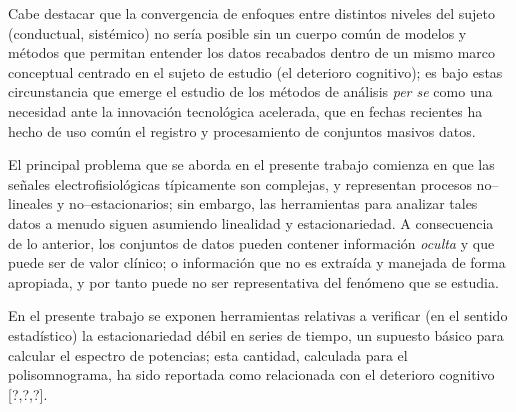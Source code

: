 Cabe destacar que 
la convergencia de enfoques entre distintos niveles del sujeto (conductual, sistémico) no sería
posible sin un cuerpo común de modelos y métodos que permitan entender los datos recabados dentro
de un mismo marco conceptual centrado en el sujeto de estudio (el deterioro cognitivo);
es bajo estas circunstancia que emerge el estudio de los métodos de análisis \textit{per se}
como una necesidad ante la innovación tecnológica acelerada, que en fechas recientes ha hecho
de uso común el registro y procesamiento de conjuntos masivos datos.

El principal problema que se aborda en el presente trabajo comienza en que las señales
electrofisiológicas típicamente son complejas, y representan procesos no--lineales y 
no--estacionarios; sin embargo, las herramientas para analizar tales datos a menudo siguen 
asumiendo linealidad y estacionariedad.
A consecuencia de lo anterior, los conjuntos de datos pueden contener
información \textit{oculta} y que puede ser de valor clínico; o información que no es extraída y 
manejada de forma apropiada, y por tanto puede no ser representativa del fenómeno que se estudia. 

En el presente trabajo se exponen herramientas relativas a verificar (en el sentido estadístico)
la estacionariedad débil en series de tiempo, un supuesto básico para calcular el espectro de potencias; esta cantidad,
calculada para el polisomnograma,
ha sido reportada como relacionada con el deterioro cognitivo [?,?,?].



